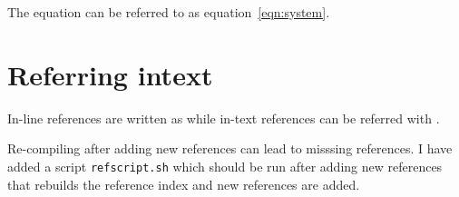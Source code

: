 \documentclass{edger}
\begin{document}
The equation can be referred to as equation~\ref{eqn:system}.

\lipsum[1-7]  

\section*{Referring intext}
In-line references are written as \cite{knuth1989} while in-text references can be referred with \cite[]{knuth1989}.

Re-compiling after adding new references can lead to misssing references. I have added a script \verb|refscript.sh| which should be run after adding new references that rebuilds the reference index and new references are added. 


\end{document}
